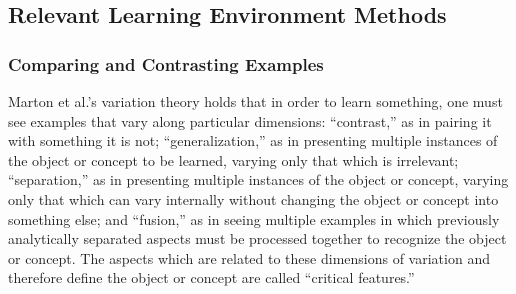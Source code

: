 \documentclass[12pt]{article}
\begin{document}
%
%

\subsection{Relevant Learning Environment Methods}

\subsubsection{Comparing and Contrasting Examples}







Marton et al.'s variation theory \cite{Marton13} holds that in order to learn something, one must see examples that vary along particular dimensions: ``contrast,'' as in pairing it with something it is not; ``generalization,'' as in presenting multiple instances of the object or concept to be learned, varying only that which is irrelevant; ``separation,'' as in presenting multiple instances of the object or concept, varying only that which can vary internally without changing the object or concept into something else; and ``fusion,'' as in seeing multiple examples in which previously analytically separated aspects must be processed together to recognize the object or concept. The aspects which are related to these dimensions of variation and therefore define the object or concept are called ``critical features.''
\end{document}
